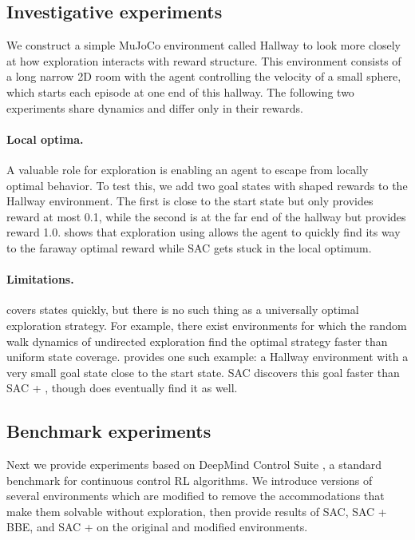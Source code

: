 \subsection{Investigative experiments}

We construct a simple MuJoCo \citep{todorov2012mujoco} environment called Hallway to look more closely at how exploration interacts with reward structure.
This environment consists of a long narrow 2D room with the agent controlling the velocity of a small sphere, which starts each episode at one end of this hallway.
The following two experiments share dynamics and differ only in their rewards.

\paragraph{Local optima.}
A valuable role for exploration is enabling an agent to escape from locally optimal behavior.
To test this, we add two goal states with shaped rewards to the Hallway environment.
The first is close to the start state but only provides reward at most 0.1, while the second is at the far end of the hallway but provides reward 1.0.
 shows that exploration using \algshort{} allows the agent to quickly find its way to the faraway optimal reward while SAC gets stuck in the local optimum.


\paragraph{Limitations.}
\algshort{} covers states quickly, but there is no such thing as a universally optimal exploration strategy.
For example, there exist environments for which the random walk dynamics of undirected exploration find the optimal strategy faster than uniform state coverage.
 provides one such example: a Hallway environment with a very small goal state close to the start state.
SAC discovers this goal faster than SAC + \algshort{}, though \algshort{} does eventually find it as well.


\subsection{Benchmark experiments}
Next we provide experiments based on DeepMind Control Suite \citep{tassa2018deepmind}, a standard benchmark for continuous control RL algorithms.
We introduce versions of several environments which are modified to remove the accommodations that make them solvable without exploration, then provide results of SAC, SAC + BBE, and SAC + \algshort{} on the original and modified environments.

